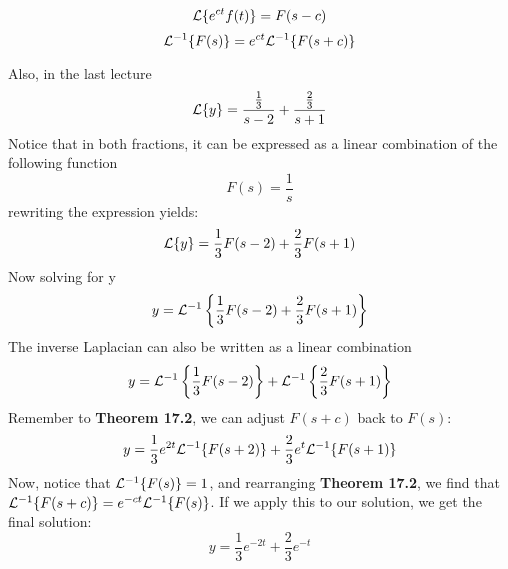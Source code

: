 \documentclass[diffeq.tex]{subfiles}
\begin{document}
    \begin{btheorem}
        \begin{equation}
            \mathcal{L}\{e^{ct}f(t)\} = F(s - c)
        \end{equation}
        \begin{equation}
            \mathcal{L}^{-1}\{F(s)\} = e^{ct}\mathcal{L}^{-1}\{F(s + c)\}
        \end{equation}
    \end{btheorem}\np
    Also, in the last lecture
    \begin{equation}
        \mathcal{L}\{y\} = \frac{\frac{1}{3}}{s - 2} + \frac{\frac{2}{3}}{s + 1}
    \end{equation}
    Notice that in both fractions, it can be expressed as a linear combination of the following function
    \begin{equation}
        F(s) = \frac{1}{s}
    \end{equation}
    rewriting the expression yields:
    \begin{equation}
        \mathcal{L}\{y\} = \frac{1}{3}F(s - 2) + \frac{2}{3}F(s + 1)
    \end{equation}
    Now solving for y
    \begin{equation}
        y = \mathcal{L}^{-1}\left\{\frac{1}{3}F(s - 2) + \frac{2}{3}F(s + 1)\right\}
    \end{equation}
    The inverse Laplacian can also be written as a linear combination
    \begin{equation}
        y = \mathcal{L}^{-1}\left\{\frac{1}{3}F(s - 2)\right\} + \mathcal{L}^{-1}\left\{\frac{2}{3}F(s + 1)\right\}
    \end{equation}
    Remember to \textbf{Theorem 17.2}, we can adjust $F(s + c)$ back to $F(s)$:
    \begin{equation}
        y = \frac{1}{3}e^{2t}\mathcal{L}^{-1}\{F(s + 2)\} + \frac{2}{3}e^{t}\mathcal{L}^{-1}\{F(s + 1)\}
    \end{equation}
    Now, notice that $\mathcal{L}^{-1}\{F(s)\} = 1$, and rearranging \textbf{Theorem 17.2}, we find that $\mathcal{L}^{-1}\{F(s + c)\} = e^{-ct}\mathcal{L}^{-1}\{F(s)\}$. If we apply this to our solution, we get the final solution:
    \begin{equation}
        y = \frac{1}{3}e^{-2t}+\frac{2}{3}e^{-t}
    \end{equation}
\end{document}
